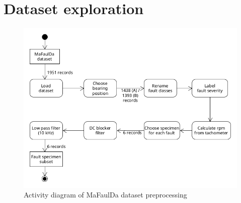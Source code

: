\section{Dataset exploration}


\begin{figure}[ht]
	\centering
	\includegraphics[width=\textwidth]{assets/design/activity-data-exploration.png}
	\caption{Activity diagram of MaFaulDa dataset preprocessing}
\end{figure}


